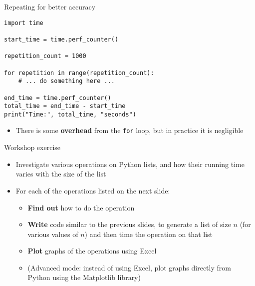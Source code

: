 \begin{frame}[fragile]{Repeating for better accuracy}
	\begin{lstlisting}
import time

start_time = time.perf_counter()

repetition_count = 1000

for repetition in range(repetition_count):
    # ... do something here ...

end_time = time.perf_counter()
total_time = end_time - start_time
print("Time:", total_time, "seconds")
	\end{lstlisting}
	
	\begin{itemize}
		\pause\item There is some \textbf{overhead} from the \lstinline{for} loop, but in practice it is negligible
	\end{itemize}
\end{frame}

\begin{frame}
	
\end{frame}

\begin{frame}
	
\end{frame}

\begin{frame}{Workshop exercise}
	\begin{itemize}
		\pause\item Investigate various operations on Python lists, and how their running time varies with the size of the list
		\pause\item For each of the operations listed on the next slide:
			\begin{itemize}
				\pause\item \textbf{Find out} how to do the operation
				\pause\item \textbf{Write} code similar to the previous slides, to generate a list of size $n$ (for various values of $n$) and then time the operation on that list
				\pause\item \textbf{Plot} graphs of the operations using Excel
				\pause\item (Advanced mode: instead of using Excel, plot graphs directly from Python using the Matplotlib library)
			\end{itemize}
	\end{itemize}
\end{frame}

